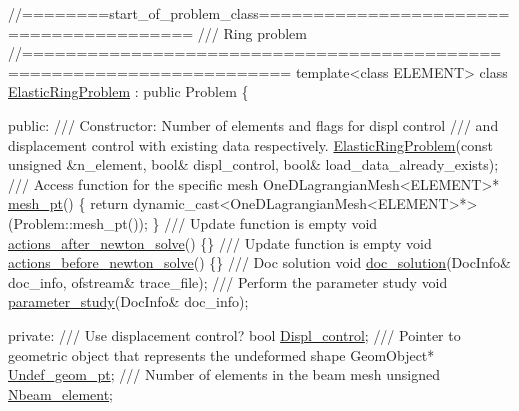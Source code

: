  
\begin{DoxyCodeInclude}
\textcolor{comment}{//========start\_of\_problem\_class========================================}
\textcolor{comment}{/// Ring problem}
\textcolor{comment}{}\textcolor{comment}{//======================================================================}
\textcolor{keyword}{template}<\textcolor{keyword}{class} ELEMENT>
\textcolor{keyword}{class }\hyperlink{classElasticRingProblem}{ElasticRingProblem} : \textcolor{keyword}{public} Problem
\{

\textcolor{keyword}{public}:
\textcolor{comment}{}
\textcolor{comment}{ /// Constructor: Number of elements and flags for displ control}
\textcolor{comment}{ /// and displacement control with existing data respectively.}
\textcolor{comment}{} \hyperlink{classElasticRingProblem_a46779ff320754561750e22216f7605e3}{ElasticRingProblem}(\textcolor{keyword}{const} \textcolor{keywordtype}{unsigned} &n\_element,
                    \textcolor{keywordtype}{bool}& displ\_control,
                    \textcolor{keywordtype}{bool}& load\_data\_already\_exists);
\textcolor{comment}{}
\textcolor{comment}{ /// Access function for the specific mesh}
\textcolor{comment}{} OneDLagrangianMesh<ELEMENT>* \hyperlink{classElasticRingProblem_a7e956ca937741ce71cf400eb492825b3}{mesh\_pt}() 
  \{
   \textcolor{keywordflow}{return} \textcolor{keyword}{dynamic\_cast<}OneDLagrangianMesh<ELEMENT>*\textcolor{keyword}{>}(Problem::mesh\_pt());
  \}
\textcolor{comment}{}
\textcolor{comment}{ /// Update function is empty }
\textcolor{comment}{} \textcolor{keywordtype}{void} \hyperlink{classElasticRingProblem_a58c2889fd4db8c17f4a4d964a5a7a90d}{actions\_after\_newton\_solve}() \{\}
\textcolor{comment}{}
\textcolor{comment}{ /// Update function is empty }
\textcolor{comment}{} \textcolor{keywordtype}{void} \hyperlink{classElasticRingProblem_a6d084ac04c73a116f5ece449935a31d3}{actions\_before\_newton\_solve}() \{\}
\textcolor{comment}{}
\textcolor{comment}{ /// Doc solution}
\textcolor{comment}{} \textcolor{keywordtype}{void} \hyperlink{classElasticRingProblem_ab644c5fd57310f2d4c858f64d8c5a223}{doc\_solution}(DocInfo& doc\_info, ofstream& trace\_file);
\textcolor{comment}{}
\textcolor{comment}{ /// Perform the parameter study}
\textcolor{comment}{} \textcolor{keywordtype}{void} \hyperlink{classElasticRingProblem_afed9c0948c535c315c3e22e92e3266d3}{parameter\_study}(DocInfo& doc\_info);

\textcolor{keyword}{private}:
\textcolor{comment}{}
\textcolor{comment}{ /// Use displacement control?}
\textcolor{comment}{} \textcolor{keywordtype}{bool} \hyperlink{classElasticRingProblem_a919d11c9d2167d909c4d4563e9ca83b6}{Displ\_control}; 
\textcolor{comment}{}
\textcolor{comment}{ /// Pointer to geometric object that represents the undeformed shape}
\textcolor{comment}{} GeomObject* \hyperlink{classElasticRingProblem_a08e4afcece28aee2d1ee2e6c54394be8}{Undef\_geom\_pt};
\textcolor{comment}{}
\textcolor{comment}{ /// Number of elements in the beam mesh}
\textcolor{comment}{} \textcolor{keywordtype}{unsigned} \hyperlink{classElasticRingProblem_aa57e3dd4e9a5187ef7394b019e68b1ca}{Nbeam\_element};


\end{DoxyCodeInclude}
